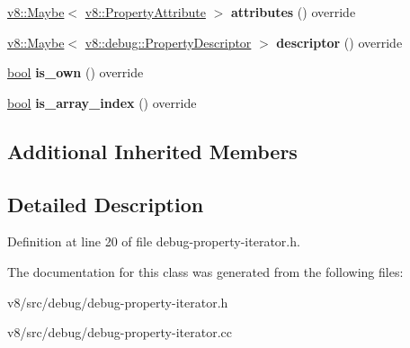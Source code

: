 \begin{DoxyCompactItemize}
\item 
\mbox{\label{classv8_1_1internal_1_1DebugPropertyIterator_aea64b851a4476e937e56c4bfd96f0075}} 
\mbox{\hyperlink{classv8_1_1Maybe}{v8\+::\+Maybe}}$<$ \mbox{\hyperlink{namespacev8_a05f25f935e108a1ea2d150e274602b87}{v8\+::\+Property\+Attribute}} $>$ {\bfseries attributes} () override
\item 
\mbox{\label{classv8_1_1internal_1_1DebugPropertyIterator_abd6b20edb0def86e3b775353fb4a4202}} 
\mbox{\hyperlink{classv8_1_1Maybe}{v8\+::\+Maybe}}$<$ \mbox{\hyperlink{structv8_1_1debug_1_1PropertyDescriptor}{v8\+::debug\+::\+Property\+Descriptor}} $>$ {\bfseries descriptor} () override
\item 
\mbox{\label{classv8_1_1internal_1_1DebugPropertyIterator_ae71d7332b8595ad1749c1d1016175df6}} 
\mbox{\hyperlink{classbool}{bool}} {\bfseries is\+\_\+own} () override
\item 
\mbox{\label{classv8_1_1internal_1_1DebugPropertyIterator_a7f281a397f440a843a190925645696b5}} 
\mbox{\hyperlink{classbool}{bool}} {\bfseries is\+\_\+array\+\_\+index} () override
\end{DoxyCompactItemize}
\subsection*{Additional Inherited Members}


\subsection{Detailed Description}


Definition at line 20 of file debug-\/property-\/iterator.\+h.



The documentation for this class was generated from the following files\+:\begin{DoxyCompactItemize}
\item 
v8/src/debug/debug-\/property-\/iterator.\+h\item 
v8/src/debug/debug-\/property-\/iterator.\+cc\end{DoxyCompactItemize}
